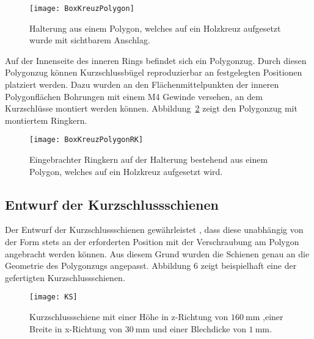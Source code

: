 \begin{figure}[htb]
	\centering
	\texttt{[image: BoxKreuzPolygon]}
	\caption{Halterung aus einem Polygon, welches auf ein Holzkreuz aufgesetzt wurde mit sichtbarem Anschlag.}
	\label{fig:BoxKreuzPolygon}
\end{figure}

Auf der Innenseite des inneren Rings befindet sich ein Polygonzug. Durch diesen Polygonzug k\"onnen Kurzschlussb\"ugel reproduzierbar an festgelegten Positionen platziert werden. Dazu wurden an den Fl\"achenmittelpunkten der inneren Polygonfl\"achen Bohrungen mit einem M4 Gewinde versehen, an dem Kurzschl\"usse montiert werden k\"onnen. Abbildung~\ref{fig:BoxKreuzPolygonRK} zeigt den Polygonzug mit montiertem Ringkern.

\begin{figure}[htb]
	\centering
	\texttt{[image: BoxKreuzPolygonRK]}
	\caption{Eingebrachter Ringkern auf der Halterung bestehend aus einem Polygon, welches auf ein Holzkreuz aufgesetzt wird.}
	\label{fig:BoxKreuzPolygonRK}
\end{figure}






\subsection{Entwurf der Kurzschlussschienen}
\label{sec:shorts}
Der Entwurf der Kurzschlussschienen gew\"ahrleistet , dass diese unabh\"angig von der Form stets an der erforderten Position mit der Verschraubung am Polygon angebracht werden k\"onnen. Aus diesem Grund wurden die Schienen genau an die Geometrie des Polygonzugs angepasst. Abbildung 6 zeigt beispielhaft eine der gefertigten Kurzschlussschienen.
\begin{figure}[htb]
	\centering
	\texttt{[image: KS]}
	\caption{Kurzschlussschiene mit einer H\"ohe in z-Richtung von $\SI{160}{\milli\meter}$ ,einer Breite in x-Richtung von $\SI{30}{\milli\meter}$ und einer Blechdicke von $\SI{1}{\milli\meter}$.}
	\label{fig:TZKS}
\end{figure}

